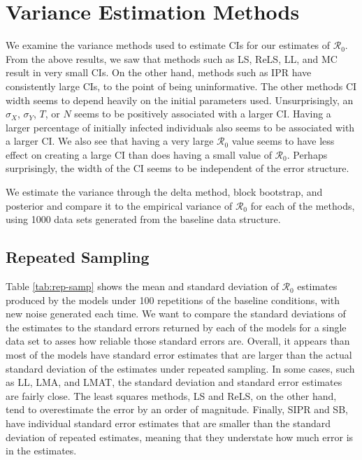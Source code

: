 \documentclass[12pt]{article}
\newcommand{\rr}{\ensuremath{\mathcal{R}_0}}
\begin{document}
\section{Variance Estimation Methods}\label{sec:sim-var-res}
We examine the variance methods used to estimate CIs for our estimates of $\rr$.  From the above results, we saw that methods such as LS, ReLS, LL, and MC result in very small CIs.  On the other hand, methods such as IPR have consistently large CIs, to the point of being uninformative.  The other methods CI width seems to depend heavily on the initial parameters used.  Unsurprisingly, an $\sigma_X$, $\sigma_Y$, $T$, or $N$ seems to be positively associated with a larger CI.  Having a larger percentage of initially infected individuals also seems to be associated with a larger CI.  We also see that having a very large $\rr$ value seems to have less effect on creating a large CI than does having a small value of $\rr$.  Perhaps surprisingly, the width of the CI seems to be independent of the error structure.

We estimate the variance through the delta method, block bootstrap, and posterior and compare it to the empirical variance of $\rr$ for each of the methods, using 1000 data sets generated from the baseline data structure.

\subsection{Repeated Sampling}

Table \ref{tab:rep-samp} shows the mean and standard deviation of $\rr$ estimates produced by the models under 100 repetitions of the baseline conditions, with new noise generated each time. We want to compare the standard deviations of the estimates to the standard errors returned by each of the models for a single data set to asses how reliable those standard errors are. Overall, it appears than most of the models have standard error estimates that are larger than the actual standard deviation of the estimates under repeated sampling. In some cases, such as LL, LMA, and LMAT, the standard deviation and standard error estimates are fairly close. The least squares methods, LS and ReLS, on the other hand, tend to overestimate the error by an order of magnitude. Finally, SIPR and SB, have individual standard error estimates that are smaller than the standard deviation of repeated estimates, meaning that they understate how much error is in the estimates.
\end{document}
